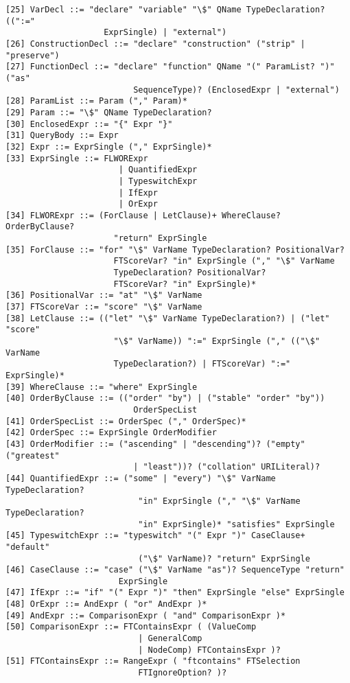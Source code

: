 \begin{Verbatim}[frame=none, fontsize=\footnotesize]
[25] VarDecl ::= "declare" "variable" "\$" QName TypeDeclaration? ((":="
                    ExprSingle) | "external")
[26] ConstructionDecl ::= "declare" "construction" ("strip" | "preserve")
[27] FunctionDecl ::= "declare" "function" QName "(" ParamList? ")" ("as"
                          SequenceType)? (EnclosedExpr | "external")
[28] ParamList ::= Param ("," Param)*
[29] Param ::= "\$" QName TypeDeclaration?
[30] EnclosedExpr ::= "{" Expr "}"
[31] QueryBody ::= Expr
[32] Expr ::= ExprSingle ("," ExprSingle)*
[33] ExprSingle ::= FLWORExpr
                       | QuantifiedExpr
                       | TypeswitchExpr
                       | IfExpr
                       | OrExpr
[34] FLWORExpr ::= (ForClause | LetClause)+ WhereClause? OrderByClause?
                      "return" ExprSingle
[35] ForClause ::= "for" "\$" VarName TypeDeclaration? PositionalVar?
                      FTScoreVar? "in" ExprSingle ("," "\$" VarName
                      TypeDeclaration? PositionalVar?
                      FTScoreVar? "in" ExprSingle)* 
[36] PositionalVar ::= "at" "\$" VarName
[37] FTScoreVar ::= "score" "\$" VarName
[38] LetClause ::= (("let" "\$" VarName TypeDeclaration?) | ("let" "score"
                      "\$" VarName)) ":=" ExprSingle ("," (("\$" VarName
                      TypeDeclaration?) | FTScoreVar) ":=" ExprSingle)*
[39] WhereClause ::= "where" ExprSingle
[40] OrderByClause ::= (("order" "by") | ("stable" "order" "by"))
                          OrderSpecList 
[41] OrderSpecList ::= OrderSpec ("," OrderSpec)*
[42] OrderSpec ::= ExprSingle OrderModifier
[43] OrderModifier ::= ("ascending" | "descending")? ("empty" ("greatest"
                          | "least"))? ("collation" URILiteral)?
[44] QuantifiedExpr ::= ("some" | "every") "\$" VarName TypeDeclaration?
                           "in" ExprSingle ("," "\$" VarName TypeDeclaration?
                           "in" ExprSingle)* "satisfies" ExprSingle
[45] TypeswitchExpr ::= "typeswitch" "(" Expr ")" CaseClause+ "default"
                           ("\$" VarName)? "return" ExprSingle
[46] CaseClause ::= "case" ("\$" VarName "as")? SequenceType "return"
                       ExprSingle
[47] IfExpr ::= "if" "(" Expr ")" "then" ExprSingle "else" ExprSingle
[48] OrExpr ::= AndExpr ( "or" AndExpr )*
[49] AndExpr ::= ComparisonExpr ( "and" ComparisonExpr )*
[50] ComparisonExpr ::= FTContainsExpr ( (ValueComp
                           | GeneralComp
                           | NodeComp) FTContainsExpr )?
[51] FTContainsExpr ::= RangeExpr ( "ftcontains" FTSelection
                           FTIgnoreOption? )?

\end{Verbatim}
